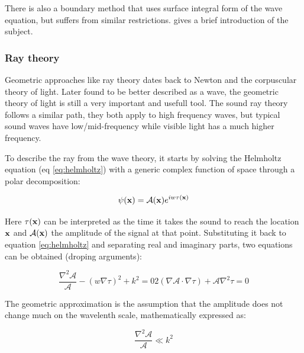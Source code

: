 There is also a boundary method that uses surface integral form of the wave
equation, but suffers from similar restrictions. \citet{funkhouser2003survey}
gives a brief introduction of the subject.

\subsubsection{Ray theory}
\label{sss:raytheory}

Geometric approaches like ray theory dates back to Newton and the corpuscular
theory of light. Later found to be better described as a wave, the geometric
theory of light is still a very important and usefull tool. The sound ray theory
follows a similar path, they both apply to high frequency waves, but typical
sound waves have low/mid-frequency while visible light has a much higher
frequency.

To describe the ray from the wave theory, it starts by solving the Helmholtz
equation (eq \ref{eq:helmholtz}) with a generic complex function of space
through a polar decomposition\cite{buckingham1992ocean,torres2007modeling}:

\begin{equation}
\label{eq:psi}
\psi(\mathrm{\mathbf{x}}) = \mathcal{A}(\mathrm{\mathbf{x}})e^{iw\tau(\mathrm{\mathbf{x}})}
\end{equation}


Here $\tau(\mathrm{\mathbf{x}})$ can be interpreted as the time it takes the sound to
reach the location $\mathrm{\mathbf{x}}$ and $\mathcal{A}(\mathrm{\mathbf{x}})$ the amplitude of the
signal at that point. Substituting it back to equation \ref{eq:helmholtz} and
separating real and imaginary parts, two equations can be obtained (droping
arguments):

\begin{subequations}
\begin{equation}
\label{eq:preeikonal}
\frac{\nabla^2\mathcal{A}}{\mathcal{A}} - (w\nabla \tau)^2 + k^2 = 0
\end{equation}

\begin{equation}
\label{eq:preeikonalamp}
2(\nabla\mathcal{A} \cdot \nabla \tau) + \mathcal{A}\nabla^2 \tau = 0
\end{equation}
\end{subequations}

The geometric approximation is the assumption that the amplitude does not change
much on the wavelenth scale, mathematically expressed as:

\begin{equation}
\label{eq:highfrequency}
\frac{\nabla^2\mathcal{A}}{\mathcal{A}} \ll k^2
\end{equation}

